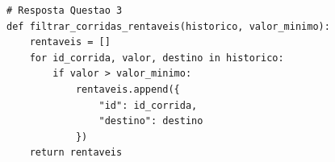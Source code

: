 \ifmostrarGabarito
\begin{verbatim}
# Resposta Questao 3
def filtrar_corridas_rentaveis(historico, valor_minimo):
    rentaveis = []
    for id_corrida, valor, destino in historico:
        if valor > valor_minimo:
            rentaveis.append({
                "id": id_corrida,
                "destino": destino
            })
    return rentaveis
\end{verbatim}
\fi
